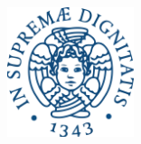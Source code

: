 \begin{titlepage}

\includegraphics[width=140px, keepaspectratio]{imgs/university.png}\\[1cm] %
 

\vfill %

\end{titlepage}